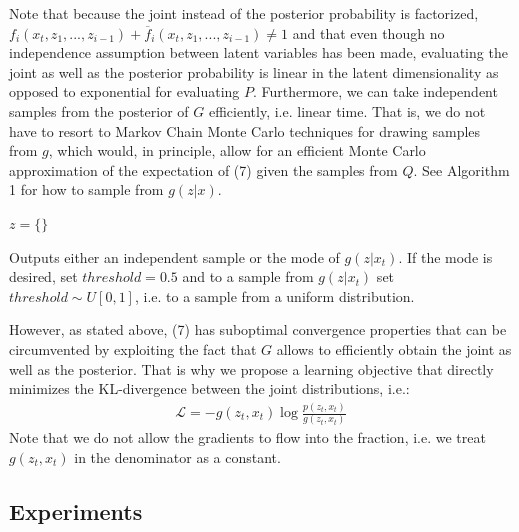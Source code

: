 Note that because the joint instead of the posterior probability is factorized, $f_i(x_t, z_1, ..., z_{i-1}) + \overline{f}_i(x_t, z_1, ..., z_{i-1}) \neq 1$ and that even though no independence assumption between latent variables has been made, evaluating the joint as well as the posterior probability is linear in the latent dimensionality as opposed to exponential for evaluating $P$. Furthermore, we can take independent samples from the posterior of $G$ efficiently, i.e. linear time. That is, we do not have to resort to Markov Chain Monte Carlo techniques for drawing samples from $g$, which would, in principle, allow for an efficient Monte Carlo approximation of the expectation of (7) given the samples from $Q$. See Algorithm 1 for how to sample from $g(z|x)$.

\begin{algorithm}
 $z = \{\}$\;
 \caption{Outputs either an independent sample or the mode of $g(z|x_t)$. If the mode is desired, set $threshold = 0.5$ and to a sample from $g(z|x_t)$ set $threshold \sim U[0,1]$, i.e. to a sample from a uniform distribution.}
\end{algorithm}

However, as stated above, (7) has suboptimal convergence properties that can be circumvented by exploiting the fact that $G$ allows to efficiently obtain the joint as well as the posterior. That is why we propose a learning objective that directly minimizes the KL-divergence between the joint distributions, i.e.:
\begin{align*}
\mathcal{L} = -g(z_t, x_t) \log \frac{p(z_t, x_t)}{g(z_t, x_t)}
\end{align*}
Note that we do not allow the gradients to flow into the fraction, i.e. we treat $g(z_t, x_t)$ in the denominator as a constant.

\subsection{Experiments}

